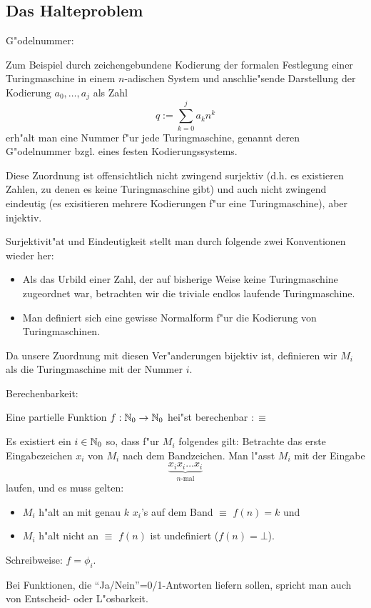 \subsection{Das Halteproblem}
 G"odelnummer:{
  Zum Beispiel durch zeichengebundene Kodierung der formalen Festlegung
  einer Turingmaschine in einem $n$-adischen System und anschlie"sende
  Darstellung der Kodierung $a_0,\ldots, a_j$ als Zahl 
  \[q:=\sum_{k=0}^j a_k n^k
    \]
  erh"alt man eine Nummer f"ur jede Turingmaschine, genannt deren 
  G"odelnummer bzgl. eines festen Kodierungssystems.
  
  Diese Zuordnung ist offensichtlich nicht zwingend surjektiv 
  (d.h. es existieren Zahlen, zu denen es keine Turingmaschine gibt) 
  und auch nicht zwingend eindeutig
  (es exisitieren mehrere Kodierungen f"ur eine Turingmaschine), aber
  injektiv.
  
  Surjektivit"at und Eindeutigkeit stellt man durch folgende zwei Konventionen
  wieder her:
  \begin{itemize}
    \item Als das Urbild einer Zahl, der auf bisherige Weise keine 
      Turingmaschine zugeordnet war, betrachten wir die triviale
      endlos laufende Turingmaschine.
    \item Man definiert sich eine gewisse Normalform f"ur die Kodierung
      von Turingmaschinen.
    \end{itemize}
  Da unsere Zuordnung mit diesen Ver"anderungen bijektiv ist, definieren
  wir $M_i$ als die Turingmaschine mit der Nummer $i$.
  }
 Berechenbarkeit:{
  Eine partielle Funktion $f:\mathbb N_0\to\mathbb N_0$ hei"st berechenbar $:\equiv$
  
  Es existiert ein $i\in\mathbb N_0$ so, dass f"ur $M_i$ folgendes gilt:
  Betrachte das erste Eingabezeichen $x_i$ von $M_i$ nach dem Bandzeichen.
  Man l"asst $M_i$ mit der Eingabe
  \[\underbrace{x_ix_i\ldots x_i}_{n\text{-mal}}
    \]
  laufen, und es muss gelten:
  \begin{itemize}
    \item $M_i$ h"alt an mit genau $k$ $x_i$'s auf dem Band $\equiv$ $f(n)=k$ und
    \item $M_i$ h"alt nicht an $\equiv$ $f(n)$ ist undefiniert ($f(n)=\bot$).
    \end{itemize}
  
  Schreibweise: $f=\phi_i$.
  
  Bei Funktionen, die ``Ja/Nein''=0/1-Antworten liefern sollen, spricht
  man auch von Entscheid- oder L"osbarkeit.
  }
